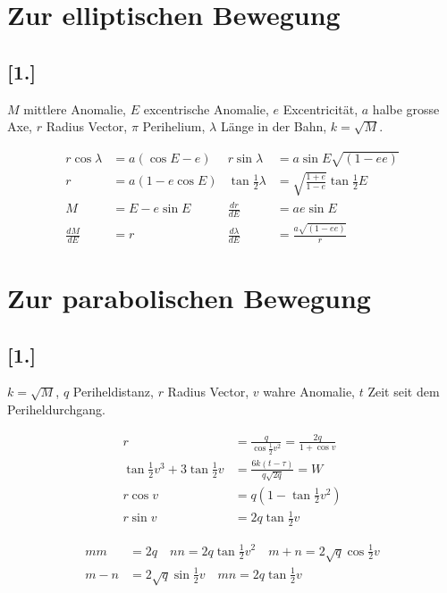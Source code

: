 \documentclass[12pt,a4paper]{article}
\begin{document}
\newpage

\section*{Zur elliptischen Bewegung}

\subsection*{[1.]}

$M$ mittlere Anomalie, $E$ excentrische Anomalie, $e$ Excentricit\"at, $a$ halbe
 grosse Axe, $r$ Radius Vector, $\pi$ Perihelium, $\lambda$ L\"ange in der Bahn, $k = \sqrt{M}$.

\begin{align*}
r\cos\lambda &= a(\cos E - e) & r\sin\lambda &= a\sin E \sqrt{(1 - ee)} \\
r &= a(1 - e\cos E) & \tan\tfrac{1}{2}\lambda &= \sqrt{\tfrac{1 + e}{1 - e}} \tan\tfrac{1}{2}E \\
M &= E - e\sin E & \frac{dr}{dE} &= ae\sin E \\
\frac{dM}{dE} &= r & \frac{d\lambda}{dE} &= \frac{a\sqrt{(1 - ee)}}{r}
\end{align*}

\newpage

\section*{Zur parabolischen Bewegung}

\subsection*{[1.]}

$k = \sqrt{M}$, $q$ Periheldistanz, $r$ Radius Vector, $v$ wahre Anomalie, $t$ Zeit
seit dem Periheldurchgang.

\begin{align*}
r &= \frac{q}{\cos\tfrac{1}{2}v^2} = \frac{2q}{1 + \cos v} \\
\tan\tfrac{1}{2}v^3 + 3\tan\tfrac{1}{2}v &= \frac{6k(t - \tau)}{q\sqrt{2q}} = W \\
r\cos v &= q(1 - \tan\tfrac{1}{2}v^2) \\
r\sin v &= 2q\tan\tfrac{1}{2}v
\end{align*}

\begin{align*}
mm &= 2q \quad nn = 2q\tan\tfrac{1}{2}v^2 \quad m + n = 2\sqrt{q}\cos\tfrac{1}{2}v \\
m - n &= 2\sqrt{q}\sin\tfrac{1}{2}v \quad mn = 2q\tan\tfrac{1}{2}v
\end{align*}
\end{document}

